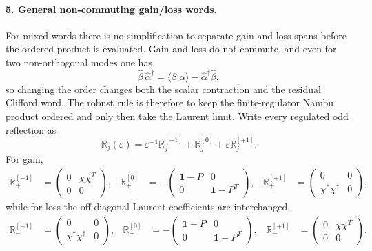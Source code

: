 \documentclass[aps,prb,onecolumn,nofootinbib,superscriptaddress]{revtex4-2}
\newcommand{\I}{\mathbf{1}}
\theoremstyle{plain}
\theoremstyle{definition}
\begin{document}
\paragraph*{5. General non-commuting gain/loss words.}
For mixed words there is no simplification to separate gain and loss spans
before the ordered product is evaluated.  Gain and loss do not commute, and
even for two non-orthogonal modes one has
\begin{equation}
  \hat\beta\,\hat\alpha^\dagger
  =
  \langle\beta|\alpha\rangle
  -
  \hat\alpha^\dagger\hat\beta ,
  \label{eq:mixed-gain-loss-contraction-order}
\end{equation}
so changing the order changes both the scalar contraction and the residual
Clifford word.  The robust rule is therefore to keep the finite-regulator
Nambu product ordered and only then take the Laurent limit.  Write every
regulated odd reflection as
\begin{equation}
  \mathbb R_j(\varepsilon)
  =
  \varepsilon^{-1}\mathbb R_j^{[-1]}
  +
  \mathbb R_j^{[0]}
  +
  \varepsilon\mathbb R_j^{[+1]} .
  \label{eq:regulated-reflection-laurent}
\end{equation}
For gain,
\begin{align}
  \mathbb R_+^{[-1]}
  &=
  \begin{pmatrix}0&\chi\chi^T\\0&0\end{pmatrix},
  &
  \mathbb R_+^{[0]}
  &=
  -
  \begin{pmatrix}\I-P&0\\0&\I-P^T\end{pmatrix},
  &
  \mathbb R_+^{[+1]}
  &=
  \begin{pmatrix}0&0\\\chi^*\chi^\dagger&0\end{pmatrix},
  \label{eq:gain-reflection-laurent-coeffs}
\end{align}
while for loss the off-diagonal Laurent coefficients are interchanged,
\begin{align}
  \mathbb R_-^{[-1]}
  &=
  \begin{pmatrix}0&0\\\chi^*\chi^\dagger&0\end{pmatrix},
  &
  \mathbb R_-^{[0]}
  &=
  -
  \begin{pmatrix}\I-P&0\\0&\I-P^T\end{pmatrix},
  &
  \mathbb R_-^{[+1]}
  &=
  \begin{pmatrix}0&\chi\chi^T\\0&0\end{pmatrix}.
  \label{eq:loss-reflection-laurent-coeffs}
\end{align}
\end{document}
